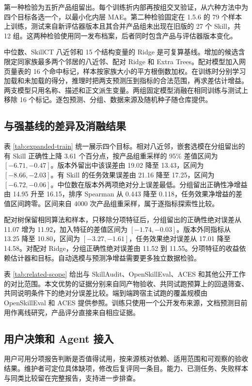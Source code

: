 \documentclass[final,5p,twocolumn,10pt]{elsarticle}
\begin{document}
第一种检验为五折产品组留出。每个训练折内部再按组交叉验证，从六种方法中为四个目标各选一个，以最小化内层 MAE。第二种检验固定在 1.5.6 的 79 个样本上训练，测试来自新评估器版本且其合并产品组未出现在旧版的 27 个 Skill，共 12 组。这两种检验使用同一发布档案，后者同时包含产品与评估器版本变化。

中位数、SkillCT 八近邻和 15 个结构变量的 Ridge 是可复算基线。增加的候选含限定同家族最多两个邻居的八近邻、配对 Ridge 和 Extra Trees。配对模型加入网页量表的 16 个命中标记，样本按家族大小的平方根倒数加权。在训练时分别学习加载和未加载的得分，推理时把两支预测压到指标的合法范围，再求差估计增益。两支模型只用名称、描述和正文派生变量。两组固定模型消融在相同训练与测试上移除 16 个标记。逐包预测、分组、数据来源及随机种子随仓库提供。

\subsection{与强基线的差异及消融结果}

表 \ref{tab:expanded-train} 统一展示四个目标。相对八近邻，嵌套选模在分组留出的有 Skill 正确性上降 3.61 个百分点，按产品组重采样的 95\% 差值区间为 $[-6.71,-0.47]$。版本外留出中该误差由 19.02 降至 13.43，区间为 $[-8.66,-2.03]$。有 Skill 的任务效果误差由 21.16 降至 17.25，区间为 $[-6.72,-0.06]$。中位数在版本外两项绝对分上误差最低。分组留出正确性净增益由 14.95 升至 16.15，排序 Spearman 从 0.443 降至 0.118，任务效果净增益的差值区间跨零。区间来自 4000 次产品组重采样，属于逐指标探索性比较。

配对树保留相同算法和样本，只移除分项特征后，分组留出的正确性绝对误差从 11.07 增为 11.92，加入特征的差值区间为 $[-1.74,-0.03]$。版本外同指标从 13.25 降至 10.80，区间为 $[-3.27,-1.61]$，任务效果绝对误差从 17.01 降至 14.58。对配对 Ridge，分组正确性绝对误差由 11.52 到 11.55。分项特征的收益依赖估计器和目标。自动选模与预测净增益需要更多独立数据检验。

表 \ref{tab:related-scope} 给出与 SkillAudit、OpenSkillEval、ACES 和其他公开工作的对比范围。本文优势的证据分别来自同产物验收、共同试跑预算上的回退筛查、共同说明条件下的绝对分误差比较。端到端跨宿主试跑的覆盖规模由 OpenSkillEval 和 ACES 提供参照。训练只使用一个公开发布来源，文档预测目前用作离线研究，产品评分直接来自相应证据。

\subsection{用户决策和 Agent 接入}

用户可用分项报告判断是否值得试用，按来源核对依赖、适用范围和可观察的验收结果。维护者可定位具体缺项，修改后复评同一条目。能力、已测任务、失败样本与同类比较留在完整报告，支持进一步排查。
\end{document}
